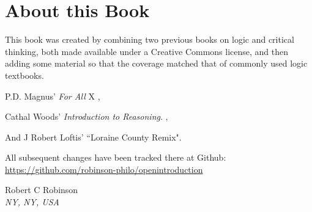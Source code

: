 
\setlength{\parindent}{1em}
\chapter{About this Book}

This book was created by combining two previous books on logic and critical thinking, both made available under a Creative Commons license, and then adding some material so that the
coverage matched that of commonly used logic textbooks.

P.D. Magnus' \textit{For All} X \parencite*{Magnus2008}, 

Cathal Woods' \textit{Introduction to Reasoning}. 
\cite{Woods2014}, 

And J Robert Loftis' ``Loraine County Remix". %

All subsequent changes have been tracked there at Github: \url{https://github.com/robinson-philo/openintroduction}



 \begin{adjustwidth}{2em}{0em}
 Robert C Robinson \\
\noindent \emph{NY, NY, USA}
\end{adjustwidth}


